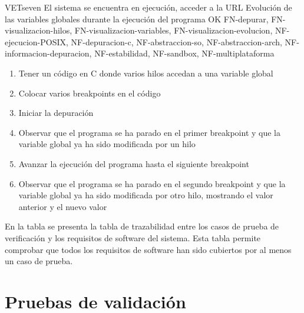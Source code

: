     \begin{testCase}{VET}{seven}
        {El sistema se encuentra en ejecución, acceder a la URL}
        {\NA}
        {Evolución de las variables globales durante la ejecución del programa}
        {OK}
        {FN-depurar, FN-visualizacion-hilos, FN-visualizacion-variables, FN-visualizacion-evolucion, NF-ejecucion-POSIX, NF-depuracion-c, NF-abstraccion-so, NF-abstraccion-arch, NF-informacion-depuracion, NF-estabilidad, NF-sandbox, NF-multiplataforma}
        \begin{enumerate}
            \item Tener un código en C donde varios hilos accedan a una variable global
            \item Colocar varios breakpoints en el código
            \item Iniciar la depuración
            \item Observar que el programa se ha parado en el primer breakpoint y que la variable global ya ha sido modificada por un hilo
            \item Avanzar la ejecución del programa hasta el siguiente breakpoint
            \item Observar que el programa se ha parado en el segundo breakpoint y que la variable global ya ha sido modificada por otro hilo, mostrando el valor anterior y el nuevo valor
        \end{enumerate}
    \end{testCase}

En la tabla  se presenta la tabla de trazabilidad entre los casos de prueba de verificación y los requisitos de software del sistema. Esta tabla permite comprobar que todos los requisitos de software han sido cubiertos por al menos un caso de prueba.
\FloatBarrier
    
\begin{landscape}
\begin{table}[htb]
      {\traceabilityVETSR}
  \end{table}
\end{landscape}

\section{Pruebas de validación}\label{sec:validacion}

